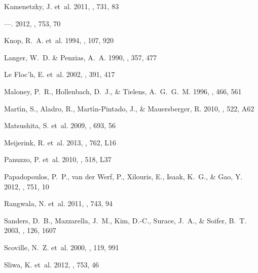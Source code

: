 \begin{thebibliography}{37}
{Kamenetzky}, J. {et~al.} 2011, \apj, 731, 83

---. 2012, \apj, 753, 70

{Knop}, R.~A. {et~al.} 1994, \aj, 107, 920

{Langer}, W.~D. \& {Penzias}, A.~A. 1990, \apj, 357, 477

{Le Floc'h}, E. {et~al.} 2002, \aap, 391, 417

{Maloney}, P.~R., {Hollenbach}, D.~J., \& {Tielens}, A.~G.~G.~M. 1996, \apj,
  466, 561

{Mart{\'{\i}}n}, S., {Aladro}, R., {Mart{\'{\i}}n-Pintado}, J., \&
  {Mauersberger}, R. 2010, \aap, 522, A62

{Matsushita}, S. {et~al.} 2009, \apj, 693, 56

{Meijerink}, R. {et~al.} 2013, \apjl, 762, L16

{Panuzzo}, P. {et~al.} 2010, \aap, 518, L37

{Papadopoulos}, P.~P., {van der Werf}, P., {Xilouris}, E., {Isaak}, K.~G., \&
  {Gao}, Y. 2012, \apj, 751, 10

{Rangwala}, N. {et~al.} 2011, \apj, 743, 94

{Sanders}, D.~B., {Mazzarella}, J.~M., {Kim}, D.-C., {Surace}, J.~A., \&
  {Soifer}, B.~T. 2003, \aj, 126, 1607

{Scoville}, N.~Z. {et~al.} 2000, \aj, 119, 991

{Sliwa}, K. {et~al.} 2012, \apj, 753, 46


\end{thebibliography}
